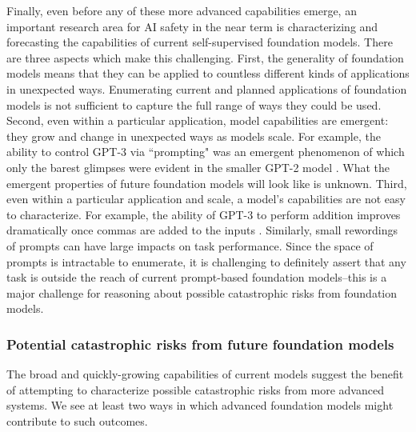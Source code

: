 Finally, even before any of these more advanced capabilities emerge, an important research area for AI safety in the near term is characterizing and forecasting the capabilities of current self-supervised foundation models. There are three aspects which make this challenging. First, the generality of foundation models means that they can be applied to countless different kinds of applications in unexpected ways. Enumerating current and planned applications of foundation models is not sufficient to capture the full range of ways they could be used. Second, even within a particular application, model capabilities are emergent: they grow and change in unexpected ways as models scale. For example, the ability to control GPT-3 via ``prompting" was an emergent phenomenon of which only the barest glimpses were evident in the smaller GPT-2 model \citep{radford2019language,brown2020gpt3}. What the emergent properties of future foundation models will look like is unknown. Third, even within a particular application and scale, a model's capabilities are not easy to characterize. For example, the ability of GPT-3 to perform addition improves dramatically once commas are added to the inputs \citep{branwen2020gpt, brockman2020math}. Similarly, small rewordings of prompts can have large impacts on task performance. Since the space of prompts is intractable to enumerate, it is challenging to definitely assert that any task is outside the reach of current prompt-based foundation models--this is a major challenge for reasoning about possible catastrophic risks from foundation models.

\subsubsection{Potential catastrophic risks from future foundation models} The broad and quickly-growing capabilities of current models suggest the benefit of attempting to characterize possible catastrophic risks from more advanced systems. We see at least two ways in which advanced foundation models might contribute to such outcomes. 

